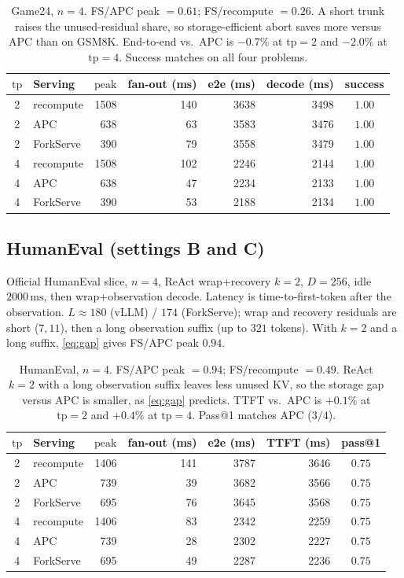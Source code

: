 \documentclass[11pt,a4paper]{article}
\begin{document}
\begin{table}[h]
\centering
\small
\begin{tabular}{@{}clrrrrc@{}}
\toprule
$\mathrm{tp}$ & Serving & $\mathrm{peak}$ & fan-out (ms) & e2e (ms) & decode (ms) & success \\
\midrule
2 & recompute & 1508 & 140 & 3638 & 3498 & $1.00$ \\
2 & APC & 638 & 63 & 3583 & 3476 & $1.00$ \\
2 & ForkServe & 390 & 79 & 3558 & 3479 & $1.00$ \\
4 & recompute & 1508 & 102 & 2246 & 2144 & $1.00$ \\
4 & APC & 638 & 47 & 2234 & 2133 & $1.00$ \\
4 & ForkServe & 390 & 53 & 2188 & 2134 & $1.00$ \\
\bottomrule
\end{tabular}
\caption{Game24, $n{=}4$.
FS/APC peak ${=}0.61$; FS/recompute ${=}0.26$.
A short trunk raises the unused-residual share, so storage-efficient abort saves more versus APC than on GSM8K.
End-to-end vs.\ APC is $-0.7\%$ at $\mathrm{tp}{=}2$ and $-2.0\%$ at $\mathrm{tp}{=}4$.
Success matches on all four problems.}
\end{table}

\subsection{HumanEval (settings B and C)}

Official HumanEval slice, $n{=}4$, ReAct wrap+recovery $k{=}2$, $D{=}256$, idle $2000\,\mathrm{ms}$, then wrap+observation decode.
Latency is time-to-first-token after the observation.
$L{\approx}180$ (vLLM) / $174$ (ForkServe); wrap and recovery residuals are short ($7,11$), then a long observation suffix (up to $321$ tokens).
With $k{=}2$ and a long suffix, \eqref{eq:gap} gives FS/APC peak $0.94$.

\begin{table}[h]
\centering
\small
\begin{tabular}{@{}clrrrrc@{}}
\toprule
$\mathrm{tp}$ & Serving & $\mathrm{peak}$ & fan-out (ms) & e2e (ms) & TTFT (ms) & pass@1 \\
\midrule
2 & recompute & 1406 & 141 & 3787 & 3646 & $0.75$ \\
2 & APC & 739 & 39 & 3682 & 3566 & $0.75$ \\
2 & ForkServe & 695 & 76 & 3645 & 3568 & $0.75$ \\
4 & recompute & 1406 & 83 & 2342 & 2259 & $0.75$ \\
4 & APC & 739 & 28 & 2302 & 2227 & $0.75$ \\
4 & ForkServe & 695 & 49 & 2287 & 2236 & $0.75$ \\
\bottomrule
\end{tabular}
\caption{HumanEval, $n{=}4$.
FS/APC peak ${=}0.94$; FS/recompute ${=}0.49$.
ReAct $k{=}2$ with a long observation suffix leaves less unused KV, so the storage gap versus APC is smaller, as \eqref{eq:gap} predicts.
TTFT vs.\ APC is $+0.1\%$ at $\mathrm{tp}{=}2$ and $+0.4\%$ at $\mathrm{tp}{=}4$.
Pass@1 matches APC ($3/4$).}
\end{table}
\end{document}
